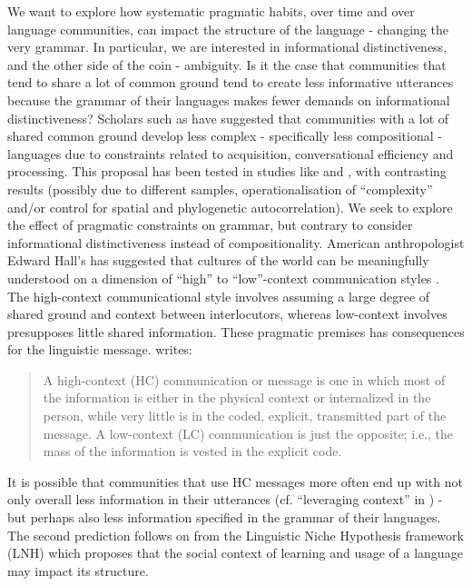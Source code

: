 \documentclass[USenglish]{article}
\begin{document}
We want to explore how systematic pragmatic habits, over time and over language communities, can impact the structure of the language - changing the very grammar. 
In particular, we are interested in informational distinctiveness, and the other side of the coin - ambiguity.
Is it the case that communities that tend to share a lot of common ground tend to create less informative utterances because the grammar of their languages makes fewer demands on informational distinctiveness?
Scholars such as \citet{wray2007consequences} have suggested that communities with a lot of shared common ground develop less complex - specifically less compositional - languages due to constraints related to acquisition, conversational efficiency and processing. 
This proposal has been tested in studies like \citet{lupyan2010language} and \citet{shcherbakova2023societies}, with contrasting results (possibly due to different samples, operationalisation of ``complexity'' and/or control for spatial and phylogenetic autocorrelation).
We seek to explore the effect of pragmatic constraints on grammar, but contrary to \citet{wray2007consequences} consider informational distinctiveness instead of compositionality. 
American anthropologist Edward Hall's has suggested that cultures of the world can be meaningfully understood on a dimension of ``high'' to ``low''-context communication styles \citep{hall1976beyond}.
The high-context communicational style involves assuming a large degree of shared ground and context between interlocutors, whereas low-context involves presupposes  little shared information. 
These pragmatic premises has consequences for the linguistic message. \citep[79]{hall1976beyond} writes: 
\begin{quote}
A high-context (HC) communication or message is one in which most of the
information is either in the physical context or internalized in the person,
while very little is in the coded, explicit, transmitted part of the message.
A low-context (LC) communication is just the opposite; i.e., the mass of the
information is vested in the explicit code.
\end{quote}
It is possible that communities that use HC messages more often end up with not only overall less information in their utterances (cf. ``leveraging context'' in \citet[29-31]{levinson2024dark}) - but perhaps also less information specified in the grammar of their languages.
The second prediction follows on from the Linguistic Niche Hypothesis framework (LNH) \citep{dale_lupyan_2012} which proposes that the social context of learning and usage of a language may impact its structure.
\end{document}
